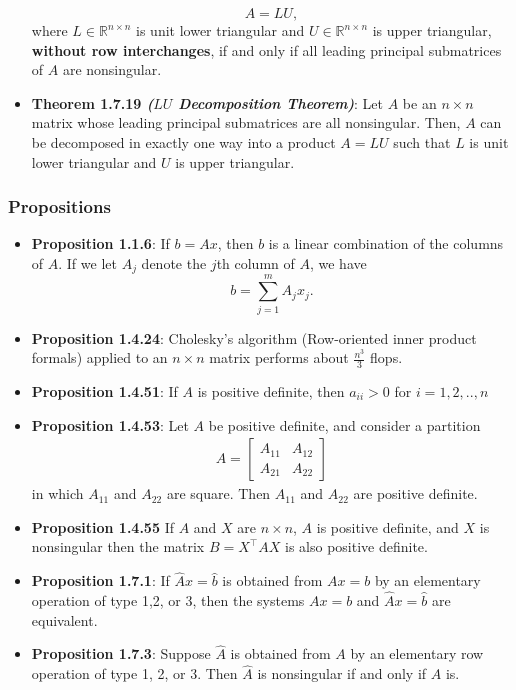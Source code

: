 \documentclass{report}
\begin{document}
\begin{itemize}
            \[
                A = LU,
            \]
            where $L \in \mathbb{R}^{n \times n}$ is unit lower triangular and 
            $U \in \mathbb{R}^{n \times n}$ is upper triangular, 
            \textbf{without row interchanges}, if and only if all leading principal 
            submatrices of $A$ are nonsingular.
    \item \textbf{Theorem 1.7.19 \textit{($LU$ Decomposition Theorem)}}: Let $A$ be an $n\times n$ matrix whose leading principal submatrices are all nonsingular. Then, $A$ can be decomposed in exactly one way into a product $A = LU$ such that $L$ is unit lower triangular and $U$ is upper triangular.


    \end{itemize}

    \pagebreak \bigbreak \noindent 
    \subsubsection{Propositions}
    \begin{itemize}
        \item \textbf{Proposition 1.1.6}: If $b = Ax$, then $b$ is a linear combination of the columns of $A$.
            \bigbreak \noindent 
            If we let $A_{j}$ denote the $j$th column of $A$, we have
            \[
                b = \sum_{j=1}^{m} A_{j} x_{j}.
            \]
        \item \textbf{Proposition 1.4.24}: Cholesky's algorithm (Row-oriented inner product formals) applied to an $n \times n$ matrix performs about $\frac{n^{3}}{3} $ flops.
        \item \textbf{Proposition 1.4.51}: If $A$ is positive definite, then $a_{ii} > 0$ for $i = 1,2,..,n$
        \item  \textbf{Proposition 1.4.53}: Let $A$ be positive definite, and consider a partition
            \begin{align*}
                A = \begin{bmatrix} A_{11} & A_{12} \\ A_{21} & A_{22} \end{bmatrix}
            \end{align*}
            in which $A_{11}$ and $A_{22} $ are square. Then $A_{11}$ and $A_{22}$ are positive definite.
        \item \textbf{Proposition 1.4.55} If $A$ and $X$ are $n\times n$, $A$ is positive definite, and $X$ is nonsingular then the matrix $B = X^{\top}AX$ is also positive definite.
        \item \textbf{Proposition 1.7.1}: If $\hat{A}x = \hat{b}$ is obtained from $Ax = b$ by an elementary operation of type 1,2, or 3, then the systems $Ax = b$ and $\hat{A}x = \hat{b}$ are equivalent.
        \item \textbf{Proposition 1.7.3}:  Suppose $\hat{A}$ is obtained from $A$ by an elementary row operation of
            type 1, 2, or 3. Then $\hat{A}$ is nonsingular if and only if $A$ is.
    \end{itemize}
\end{document}
